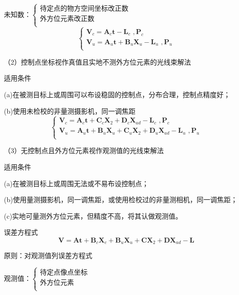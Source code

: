 \documentclass[a4paper]{ctexart}
\begin{document}
未知数：$\begin{cases}
	\text{待定点的物方空间坐标改正数}\\
	\text{外方位元素改正数}\\
\end{cases}$
$$
\begin{cases}
	\boldsymbol{V}_c=\boldsymbol{A}_c\boldsymbol{t}-\boldsymbol{L}_c\,\,, \boldsymbol{P}_c\\
	\boldsymbol{V}_u=\boldsymbol{A}_u\boldsymbol{t}+\boldsymbol{B}_u\boldsymbol{X}_u-\boldsymbol{L}_u\,\,, \boldsymbol{P}_u\\
\end{cases}
$$

（2）控制点坐标视作真值且实地不测外方位元素的光线束解法 

适用条件

(a)在被测目标上或周围可以布设稳固的控制点，分布合理，控制点精度好；

(b)使用未检校的非量测摄影机，同一调焦距
$$
\begin{cases}
	\boldsymbol{V}_c=\boldsymbol{A}_c\boldsymbol{t}+\boldsymbol{C}_c\boldsymbol{X}_2+\boldsymbol{D}_c\boldsymbol{X}_{ad}-\boldsymbol{L}_c\,\,, \boldsymbol{P}_c\\
	\boldsymbol{V}_u=\boldsymbol{A}_u\boldsymbol{t}+\boldsymbol{B}_u\boldsymbol{X}_u+\boldsymbol{C}_u\boldsymbol{X}_2+\boldsymbol{D}_u\boldsymbol{X}_{ad}-\boldsymbol{L}_u\,\,, \boldsymbol{P}_u\\
\end{cases}
$$

（3）无控制点且外方位元素视作观测值的光线束解法

适用条件

(a)在被测目标上或周围无法或不易布设控制点；

(b)使用量测摄影机，同一调焦距，或使用检校过的非量测相机，同一调焦距；

(c)实地可量测外方位元素，但精度不高，将其认做观测值。

误差方程式
$$
\boldsymbol{V}=\boldsymbol{At}+\boldsymbol{B}_c\boldsymbol{X}_c+\boldsymbol{B}_u\boldsymbol{X}_u+\boldsymbol{CX}_2+\boldsymbol{DX}_{ad}-\boldsymbol{L}
$$

原则：对观测值列误差方程式

观测值：$\begin{cases}
	\text{待定点像点坐标}\\
	\text{外方位元素}\\
\end{cases}$
\end{document}
